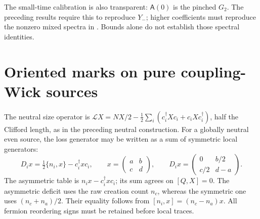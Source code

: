 \documentclass[11pt]{article}
\newcommand{\LL}{\mathcal L}
\begin{document}
The small-time calibration is also transparent: $\mathsf A(0)$ is the
pinched $G_2$. The preceding results require this to reproduce $Y_-$;
higher coefficients must reproduce the nonzero mixed spectra in
\cite{Two}. Bounds alone do not establish those spectral identities.

\newpage
\section{Oriented marks on pure coupling-Wick sources}
The neutral size operator is
$\LL X=NX/2-\tfrac12\sum_i(c_i^\dagger Xc_i+c_iXc_i^\dagger)$,
half the Clifford length, as in the preceding neutral construction.
For a globally neutral even source, the loss generator may be written
as a sum of symmetric local generators:
\begin{equation}
 D_i x=\tfrac12\{n_i,x\}-c_i^\dagger xc_i,
 \qquad x=\begin{pmatrix}a&b\\c&d\end{pmatrix},\qquad
 D_i x=\begin{pmatrix}0&b/2\\c/2&d-a\end{pmatrix}.\label{eq:localD}
\end{equation}
The asymmetric table is $n_ix-c_i^\dagger xc_i$; its sum agrees
on $[Q,X]=0$. The asymmetric deficit uses the raw creation count
$n_c$, whereas the symmetric one uses $(n_c+n_a)/2$.
Their equality follows from $[n_i,x]=(n_c-n_a)x$.
All fermion reordering signs must be retained before local traces.
\end{document}
